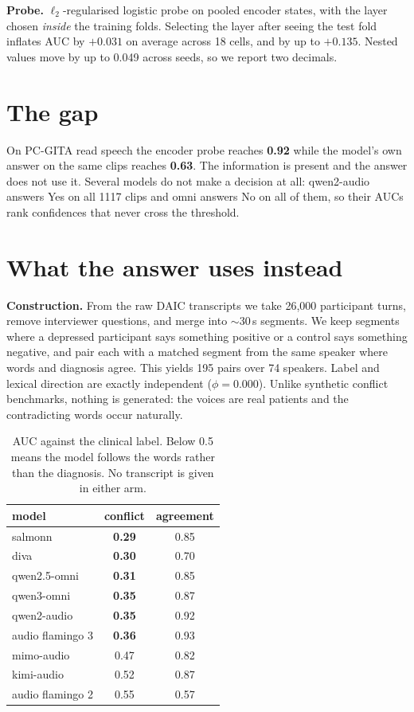 \documentclass{article}
\begin{document}
\noindent\textbf{Probe.} $\ell_2$-regularised logistic probe on pooled encoder states, with the
layer chosen \emph{inside} the training folds. Selecting the layer after seeing the test fold
inflates AUC by $+0.031$ on average across 18 cells, and by up to $+0.135$. Nested values move
by up to 0.049 across seeds, so we report two decimals.

\section{The gap}\label{sec:gap}

On PC-GITA read speech the encoder probe reaches \textbf{0.92} while the model's own answer on
the same clips reaches \textbf{0.63}. The information is present and the answer does not use
it. Several models do not make a decision at all: qwen2-audio answers Yes on all 1117 clips and
omni answers No on all of them, so their AUCs rank confidences that never cross the threshold.

\section{What the answer uses instead}\label{sec:conflict}

\noindent\textbf{Construction.} From the raw DAIC transcripts we take 26{,}000 participant
turns, remove interviewer questions, and merge into $\sim$30\,s segments. We keep segments
where a depressed participant says something positive or a control says something negative, and
pair each with a matched segment from the same speaker where words and diagnosis agree. This
yields 195 pairs over 74 speakers. Label and lexical direction are exactly independent
($\phi=0.000$). Unlike synthetic conflict benchmarks, nothing is generated: the voices are real
patients and the contradicting words occur naturally.

\begin{table}[t]
\centering\small
\caption{AUC against the clinical label. Below 0.5 means the model follows the words rather
than the diagnosis. No transcript is given in either arm.}
\label{tab:conflict}
\begin{tabular}{@{}lcc@{}}
\toprule
model & conflict & agreement \\
\midrule
salmonn            & \textbf{0.29} & 0.85 \\
diva               & \textbf{0.30} & 0.70 \\
qwen2.5-omni       & \textbf{0.31} & 0.85 \\
qwen3-omni         & \textbf{0.35} & 0.87 \\
qwen2-audio        & \textbf{0.35} & 0.92 \\
audio flamingo 3   & \textbf{0.36} & 0.93 \\
mimo-audio         & 0.47 & 0.82 \\
kimi-audio         & 0.52 & 0.87 \\
audio flamingo 2   & 0.55 & 0.57 \\
\bottomrule
\end{tabular}
\end{table}
\end{document}
